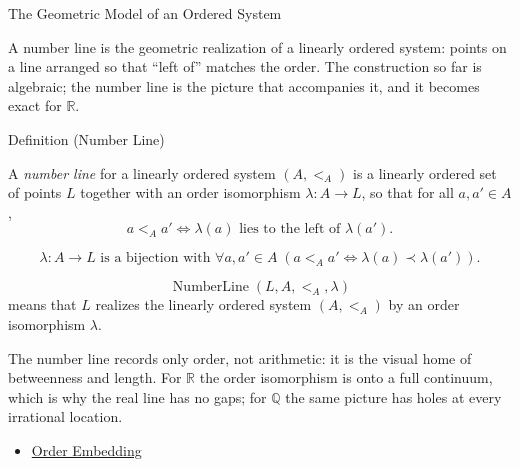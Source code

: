 \begin{topicbox}{The Geometric Model of an Ordered System}
\begin{exposition}
A number line is the geometric realization of a linearly ordered system: points on a line arranged so that ``left of'' matches the order. The construction so far is algebraic; the number line is the picture that accompanies it, and it becomes exact for $\mathbb{R}$.
\end{exposition}
\end{topicbox}
\begin{definitionbox}{Definition (Number Line)}
\begin{definition}
\label{def:number-line}
A \emph{number line} for a linearly ordered system $(A,<_A)$ is a linearly ordered set of points $L$ together with an order isomorphism $\lambda:A\to L$, so that for all $a,a'\in A$,
\[
a<_A a' \Longleftrightarrow \lambda(a) \text{ lies to the left of } \lambda(a').
\]
\end{definition}
\end{definitionbox}
\begin{remark*}
\[
\lambda:A\to L \text{ is a bijection with } \forall a,a'\in A\;(a<_A a'\Leftrightarrow \lambda(a)\prec\lambda(a')).
\]
\end{remark*}
\begin{remark*}
\[
\operatorname{NumberLine}(L,A,<_A,\lambda)
\]
means that $L$ realizes the linearly ordered system $(A,<_A)$ by an order isomorphism $\lambda$.
\end{remark*}
\begin{remark*}[Interpretation]
The number line records only order, not arithmetic: it is the visual home of betweenness and length. For $\mathbb{R}$ the order isomorphism is onto a full continuum, which is why the real line has no gaps; for $\mathbb{Q}$ the same picture has holes at every irrational location.
\end{remark*}
\begin{dependencies}
\begin{itemize}
  \item \hyperref[def:order-embedding]{Order Embedding}
\end{itemize}
\end{dependencies}
